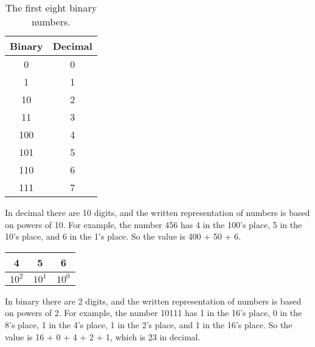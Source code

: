\begin{table}[!ht]
\begin{center}
\begin{tabular}{|c|c|}
\hline
Binary & Decimal \\
\hline
0 & 0 \\
\hline
1 & 1 \\
\hline
10 & 2 \\
\hline
11 & 3 \\
\hline
100 & 4 \\
\hline
101 & 5 \\
\hline
110 & 6 \\
\hline
111 & 7 \\
\hline
\end{tabular}
\caption{The first eight binary numbers.}
\label{tab:binary}
\end{center}
\end{table}




In decimal there are 10 digits, and the written representation of numbers is based on powers of 10.
For example, the number 456 has 4 in the 100's place, 5 in the 10's place, and 6 in the 1's place.
So the value is 400 + 50 + 6.

\begin{center}
\begin{tabular}{|c|c|c|}
\hline
4 & 5 & 6 \\
\hline
$10^2$ & $10^1$ & $10^0$ \\
\hline
\end{tabular}
\end{center}

In binary there are 2 digits, and the written representation of numbers is based on powers of 2.
For example, the number 10111 has 1 in the 16's place, 0 in the 8's place, 1 in the 4's place, 1 in the 2's place, and 1 in the 16's place.
So the value is 16 + 0 + 4 + 2 + 1, which is 23 in decimal.

